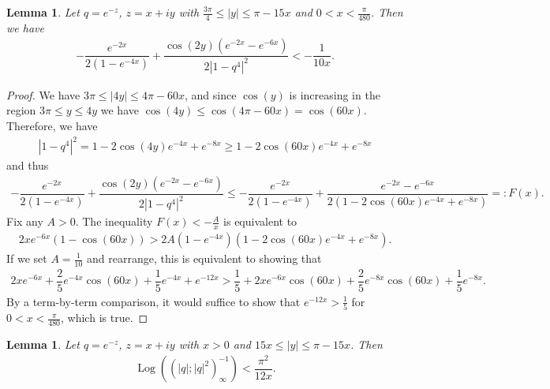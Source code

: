 \documentclass[11pt,reqno]{amsart}
\theoremstyle{definition}
\theoremstyle{plain}
\newtheorem{lemma}[theorem]{Lemma}
\theoremstyle{named}
\DeclareMathOperator\Log{Log}
\numberwithin{equation}{section}
\theoremstyle{example}
\def\lp{\left(}
\def\rp{\right)}
\begin{document}
\begin{lemma} \label{Beta Estimates}
Let $q = e^{-z}$, $z = x + iy$ with $\frac{3\pi}{4} \leq |y| \leq \pi - 15x$ and $0 < x < \frac{\pi}{480}$. Then we have
\begin{align*}
    - \dfrac{e^{-2x}}{2\lp 1 - e^{-4x} \rp} + \dfrac{\cos\lp 2y \rp \lp e^{-2x} - e^{-6x} \rp}{2\left| 1 - q^4 \right|^2} < - \dfrac{1}{10x}. 
\end{align*}
\end{lemma}

\begin{proof}
We have $3\pi \leq |4y| \leq 4\pi - 60x$, and since $\cos\lp y \rp$ is increasing in the region $3\pi \leq y \leq 4y$ we have $\cos\lp 4y \rp \leq \cos\lp 4\pi - 60x \rp = \cos\lp 60 x \rp$. Therefore, we have
\begin{align*}
    \left| 1 - q^4 \right|^2 = 1 - 2 \cos\lp 4y \rp e^{-4x} + e^{-8x} \geq 1 - 2 \cos\lp 60x \rp e^{-4x} + e^{-8x}
\end{align*}
and thus
\begin{align*}
    - \dfrac{e^{-2x}}{2\lp 1 - e^{-4x} \rp} + \dfrac{\cos\lp 2y \rp \lp e^{-2x} - e^{-6x} \rp}{2\left| 1 - q^4 \right|^2} \leq - \dfrac{e^{-2x}}{2\lp 1 - e^{-4x} \rp} + \dfrac{e^{-2x} - e^{-6x}}{2\lp 1 - 2 \cos\lp 60x \rp e^{-4x} + e^{-8x} \rp} =: F(x).
\end{align*}
Fix any $A > 0$. The inequality $F(x) < - \frac{A}{x}$ is equivalent to
\begin{align*}
    2 x e^{-6x}\lp 1 - \cos\lp 60x \rp \rp > 2A\lp 1 - e^{-4x} \rp \lp 1 - 2 \cos\lp 60x \rp e^{-4x} + e^{-8x} \rp.
\end{align*}
If we set $A = \frac{1}{10}$ and rearrange, this is equivalent to showing that
\begin{align*}
    2x e^{-6x} + \dfrac{2}{5} e^{-4x} \cos\lp 60x \rp + \dfrac{1}{5} e^{-4x} + e^{-12x} > \dfrac{1}{5} + 2x e^{-6x} \cos\lp 60x \rp + \dfrac{2}{5} e^{-8x} \cos\lp 60x \rp + \dfrac{1}{5} e^{-8x}.
\end{align*}
By a term-by-term comparison, it would suffice to show that $e^{-12x} > \frac{1}{5}$ for $0 < x < \frac{\pi}{480}$, which is true.
\end{proof}

\begin{lemma} \label{PI^2/12 Lemma}
Let $q = e^{-z}$, $z = x + iy$ with $x>0$ and $15x \leq |y| \leq \pi - 15x$. Then
\begin{align*}
    \Log\lp \lp |q|; |q|^2 \rp_\infty^{-1} \rp < \dfrac{\pi^2}{12x}.
\end{align*}
\end{lemma}
\end{document}
